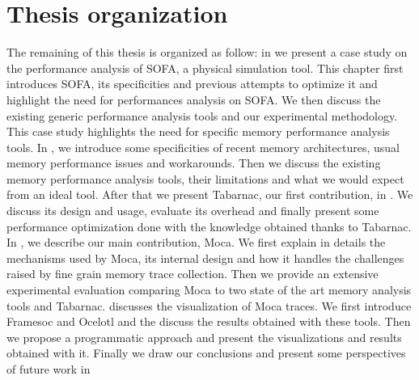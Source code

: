 \section{Thesis organization}

The remaining of this thesis is organized as follow:
in  we present a case study on the performance analysis of \gls{SOFA}, a physical simulation tool.
This chapter first introduces \gls{SOFA}, its specificities and previous attempts to optimize it and highlight the need for performances analysis on \gls{SOFA}.
We then discuss the existing generic performance analysis tools and our experimental methodology.
This case study highlights the need for specific memory performance analysis tools.
In , we introduce some specificities of recent memory architectures, usual memory performance issues and workarounds.
Then we discuss the existing memory performance analysis tools, their limitations and what we would expect from an ideal tool.
After that we present \gls{Tabarnac}, our first contribution, in .
We discuss its design and usage, evaluate its overhead and finally present some performance optimization done with the knowledge obtained thanks to \gls{Tabarnac}.
In , we describe our main contribution, \gls{Moca}.
We first explain in details the mechanisms used by \gls{Moca}, its internal design and how it handles the challenges raised by fine grain memory trace collection.
Then we provide an extensive experimental evaluation comparing \gls{Moca} to two state of the art memory analysis tools and \gls{Tabarnac}.
 discusses the visualization of \gls{Moca} traces.
We first introduce \gls{Framesoc} and \gls{Ocelotl} and the discuss the results obtained with these tools.
Then we propose a programmatic approach and present the visualizations and results obtained with it.
Finally we draw our conclusions and present some perspectives of future work in 

\glsresetall

